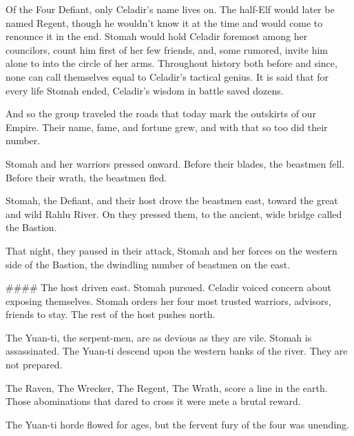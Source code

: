 Of the Four Defiant, only Celadir's name lives on.
The half-Elf would later be named Regent, though he wouldn't know it at the time
  and would come to renounce it in the end.
Stomah would hold Celadir foremost among her councilors,
  count him first of her few friends,
  and, some rumored, invite him alone to into the circle of her arms.
Throughout history both before and since, none can call themselves equal
  to Celadir's tactical genius.
It is said that for every life Stomah ended, Celadir's wisdom in battle saved dozens.

\hrulefill

And so the group traveled the roads that today mark the outskirts of our Empire.
Their name, fame, and fortune grew, and with that so too did their number.

Stomah and her warriors pressed onward.
Before their blades, the beastmen fell.
Before their wrath, the beastmen fled.

Stomah, the Defiant, and their host drove the beastmen east,
  toward the great and wild Rahlu River.
On they pressed them, to the ancient, wide bridge called the Bastion.

That night, they paused in their attack, Stomah and her forces on the western side of the Bastion,
  the dwindling number of beastmen on the east.



####
The host driven east.
Stomah pursued.
Celadir voiced concern about exposing themselves.
Stomah orders her four most trusted warriors, advisors, friends to stay.
The rest of the host pushes north.

The Yuan-ti, the serpent-men, are as devious as they are vile.
Stomah is assassinated.
The Yuan-ti descend upon the western banks of the river.
They are not prepared.

The Raven, The Wrecker, The Regent, The Wrath, score a line in the earth.
Those abominations that dared to cross it were mete a brutal reward.

The Yuan-ti horde flowed for ages, but the fervent fury of the four was unending.
